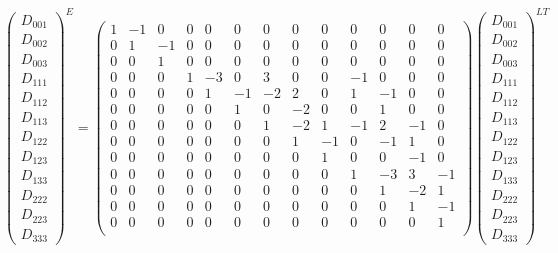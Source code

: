 \begin{equation}
\begin{pmatrix}D_{001}\\D_{002}\\D_{003}\\D_{111}\\D_{112}\\D_{113}\\D_{122}\\D_{123}\\D_{133}\\D_{222}\\D_{223}\\D_{333}\end{pmatrix}^{E} =
\left(\!\!
\begin{array}{ccccccccccccc}
 1 & -1 & 0 & 0 & 0 & 0 & 0 & 0 & 0 & 0 & 0 & 0 & 0 \\
 0 & 1 & -1 & 0 & 0 & 0 & 0 & 0 & 0 & 0 & 0 & 0 & 0 \\
 0 & 0 & 1 & 0 & 0 & 0 & 0 & 0 & 0 & 0 & 0 & 0 & 0 \\
 0 & 0 & 0 & 1 & -3 & 0 & 3 & 0 & 0 & -1 & 0 & 0 & 0 \\
 0 & 0 & 0 & 0 & 1 & -1 & -2 & 2 & 0 & 1 & -1 & 0 & 0 \\
 0 & 0 & 0 & 0 & 0 & 1 & 0 & -2 & 0 & 0 & 1 & 0 & 0 \\
 0 & 0 & 0 & 0 & 0 & 0 & 1 & -2 & 1 & -1 & 2 & -1 & 0 \\
 0 & 0 & 0 & 0 & 0 & 0 & 0 & 1 & -1 & 0 & -1 & 1 & 0 \\
 0 & 0 & 0 & 0 & 0 & 0 & 0 & 0 & 1 & 0 & 0 & -1 & 0 \\
 0 & 0 & 0 & 0 & 0 & 0 & 0 & 0 & 0 & 1 & -3 & 3 & -1 \\
 0 & 0 & 0 & 0 & 0 & 0 & 0 & 0 & 0 & 0 & 1 & -2 & 1 \\
 0 & 0 & 0 & 0 & 0 & 0 & 0 & 0 & 0 & 0 & 0 & 1 & -1 \\
 0 & 0 & 0 & 0 & 0 & 0 & 0 & 0 & 0 & 0 & 0 & 0 & 1 \\
\end{array}
\!\!\right)
\begin{pmatrix}D_{001}\\D_{002}\\D_{003}\\D_{111}\\D_{112}\\D_{113}\\D_{122}\\D_{123}\\D_{133}\\D_{222}\\D_{223}\\D_{333}\end{pmatrix}^{LT}
\end{equation}


